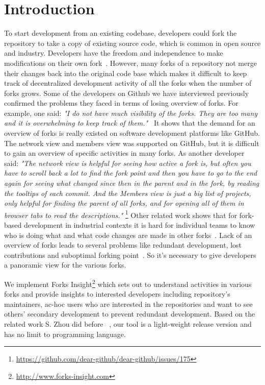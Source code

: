 \section{Introduction}
To start development from an existing codebase, developers could fork the repository to take a copy of existing source code, which is common in open source and industry. Developers have the freedom and independence to make modifications on their own fork~\cite{dubinsky2013exploratory, bitzer2006impact, ernst2010code,vetter2007open}. However, many forks of a repository not merge their changes back into the original code base which makes it difficult to keep track of decentralized development activity of all the forks when the number of forks grows.  Some of the developers on Github we have interviewed previously confirmed the problems they faced in terms of losing overview of forks. For example, one said: \emph{"I do not have much visibility of the forks. They are too many and it is overwhelming to keep track of them."}~\cite{ZSLXWK:ICSE18} It shows that the demand for an overview of forks is really existed on software development platforms like GitHub. The network view and members view was supported on GitHub, but it is difficult to gain an overview of specific activities in many forks. As another developer said: \emph{"The network view is helpful for seeing how active a fork is, but often you have to scroll back a lot to find the fork point and then you have to go to the end again for seeing what changed since then in the parent and in the fork, by reading the tooltips of each commit. And the Members view is just a big list of projects, only helpful for finding the parent of all forks, and for opening all of them in browser tabs to read the descriptions."} \footnote{\url{https://github.com/dear-github/dear-github/issues/175}}
Other related work shows that for fork-based development in industrial contexts it is hard for individual teams to know who is doing what and what code changes are made in other forks~\cite{berger2014three,Duc:2014:FCM:2652524.2652546}. Lack of an overview of forks leads to several problems like redundant development, lost contributions and suboptimal forking point~\cite{dubinsky2013exploratory,stanciulescu2015forked}. So it's necessary to give developers a panoramic view for the various forks.

We implement Forks Insight\footnote{\url{http://www.forks-insight.com}} which sets out to understand activities in various forks and provide insights to interested developers including repository's maintainers, ac-hoc users who are interested in the repositories and want to see others' secondary development to prevent redundant development. Based on the related work S. Zhou did before ~\cite{ZSLXWK:ICSE18}, our tool is a light-weight release version and has no limit to programming language.


